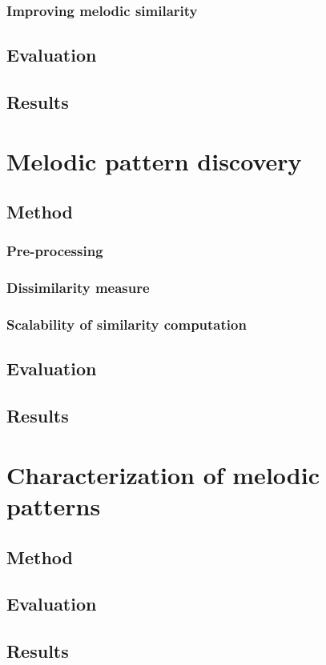 \subsubsection{Improving melodic similarity}
\subsection{Evaluation}
\subsection{Results}

\section{Melodic pattern discovery}
\subsection{Method}
\subsubsection{Pre-processing}
\subsubsection{Dissimilarity measure}
\subsubsection{Scalability of similarity computation}
\subsection{Evaluation}
\subsection{Results}


\section{Characterization of melodic patterns}
\subsection{Method}
\subsection{Evaluation}
\subsection{Results}
